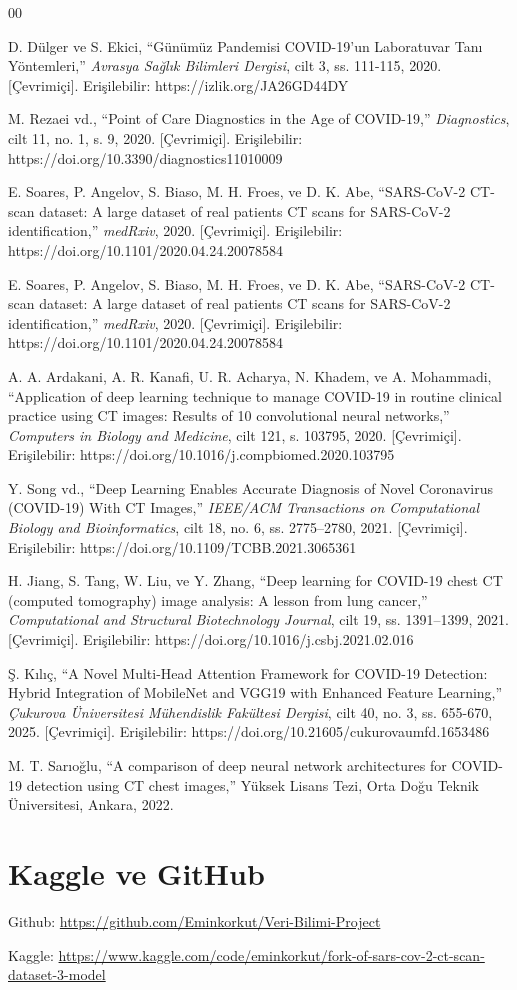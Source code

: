 \documentclass[conference]{IEEEtran}
\begin{document}
\begin{thebibliography}{00}

 D. Dülger ve S. Ekici, ``Günümüz Pandemisi COVID-19'un Laboratuvar Tanı Yöntemleri,'' \textit{Avrasya Sağlık Bilimleri Dergisi}, cilt 3, ss. 111-115, 2020. [Çevrimiçi]. Erişilebilir: https://izlik.org/JA26GD44DY

 M. Rezaei vd., ``Point of Care Diagnostics in the Age of COVID-19,'' \textit{Diagnostics}, cilt 11, no. 1, s. 9, 2020. [Çevrimiçi]. Erişilebilir: https://doi.org/10.3390/diagnostics11010009

 E. Soares, P. Angelov, S. Biaso, M. H. Froes, ve D. K. Abe, ``SARS-CoV-2 CT-scan dataset: A large dataset of real patients CT scans for SARS-CoV-2 identification,'' \textit{medRxiv}, 2020. [Çevrimiçi]. Erişilebilir: https://doi.org/10.1101/2020.04.24.20078584

 E. Soares, P. Angelov, S. Biaso, M. H. Froes, ve D. K. Abe, ``SARS-CoV-2 CT-scan dataset: A large dataset of real patients CT scans for SARS-CoV-2 identification,'' \textit{medRxiv}, 2020. [Çevrimiçi]. Erişilebilir: https://doi.org/10.1101/2020.04.24.20078584

 A. A. Ardakani, A. R. Kanafi, U. R. Acharya, N. Khadem, ve A. Mohammadi, ``Application of deep learning technique to manage COVID-19 in routine clinical practice using CT images: Results of 10 convolutional neural networks,'' \textit{Computers in Biology and Medicine}, cilt 121, s. 103795, 2020. [Çevrimiçi]. Erişilebilir: https://doi.org/10.1016/j.compbiomed.2020.103795

 Y. Song vd., ``Deep Learning Enables Accurate Diagnosis of Novel Coronavirus (COVID-19) With CT Images,'' \textit{IEEE/ACM Transactions on Computational Biology and Bioinformatics}, cilt 18, no. 6, ss. 2775–2780, 2021. [Çevrimiçi]. Erişilebilir: https://doi.org/10.1109/TCBB.2021.3065361

 H. Jiang, S. Tang, W. Liu, ve Y. Zhang, ``Deep learning for COVID-19 chest CT (computed tomography) image analysis: A lesson from lung cancer,'' \textit{Computational and Structural Biotechnology Journal}, cilt 19, ss. 1391–1399, 2021. [Çevrimiçi]. Erişilebilir: https://doi.org/10.1016/j.csbj.2021.02.016

 Ş. Kılıç, ``A Novel Multi-Head Attention Framework for COVID-19 Detection: Hybrid Integration of MobileNet and VGG19 with Enhanced Feature Learning,'' \textit{Çukurova Üniversitesi Mühendislik Fakültesi Dergisi}, cilt 40, no. 3, ss. 655-670, 2025. [Çevrimiçi]. Erişilebilir: https://doi.org/10.21605/cukurovaumfd.1653486

 M. T. Sarıoğlu, ``A comparison of deep neural network architectures for COVID-19 detection using CT chest images,'' Yüksek Lisans Tezi, Orta Doğu Teknik Üniversitesi, Ankara, 2022.

\end{thebibliography}

\section*{Kaggle ve GitHub}

Github:
\url{https://github.com/Eminkorkut/Veri-Bilimi-Project}

Kaggle:
\url{https://www.kaggle.com/code/eminkorkut/fork-of-sars-cov-2-ct-scan-dataset-3-model}
\end{document}

